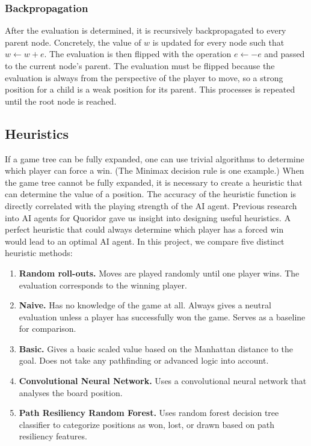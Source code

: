\documentclass[10pt]{article}
\begin{document}
\subsubsection{Backpropagation}

After the evaluation is determined, it is recursively backpropagated to every parent node. Concretely, the value of $w$ is updated for every node such that $w \gets w + e$. The evaluation is then flipped with the operation $e \gets -e$ and passed to the current node's parent. The evaluation must be flipped because the evaluation is always from the perspective of the player to move, so a strong position for a child is a weak position for its parent. This processes is repeated until the root node is reached.

\subsection{Heuristics}

If a game tree can be fully expanded, one can use trivial algorithms to determine which player can force a win. (The Minimax decision rule is one example.\cite{russell2020aima}) When the game tree cannot be fully expanded, it is necessary to create a heuristic that can determine the value of a position. The accuracy of the heuristic function is directly correlated with the playing strength of the AI agent. Previous research into AI agents for Quoridor gave us insight into designing useful heuristics. \cite{brown2018quoridor} A perfect heuristic that could always determine which player has a forced win would lead to an optimal AI agent. In this project, we compare five distinct heuristic methods:

\begin{enumerate}
    \item \textbf{Random roll-outs.} Moves are played randomly until one player wins. The evaluation corresponds to the winning player.
    \item \textbf{Naive.} Has no knowledge of the game at all. Always gives a neutral evaluation unless a player has successfully won the game. Serves as a baseline for comparison.
    \item \textbf{Basic.} Gives a basic scaled value based on the Manhattan distance to the goal. Does not take any pathfinding or advanced logic into account.
    \item \textbf{Convolutional Neural Network.} Uses a convolutional neural network that analyses the board position.
    \item \textbf{Path Resiliency Random Forest.} Uses random forest decision tree classifier to categorize positions as won, lost, or drawn based on path resiliency features.
\end{enumerate}
\end{document}
